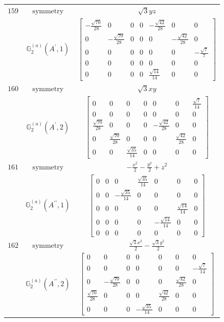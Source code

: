 \documentclass[fleqn,8pt,landscape]{jsarticle}
\begin{document}
\begin{longtable}{ccc}
$ 159 $ & $ \text{symmetry} $ & $ \sqrt{3} y z $ \\
$  $ & $ \mathbb{G}_{2}^{(a)}(A^{\prime},1) $ & $ \begin{bmatrix} - \frac{\sqrt{70}}{28} & 0 & 0 & 0 & - \frac{\sqrt{42}}{28} & 0 & 0 \\ 0 & - \frac{\sqrt{70}}{28} & 0 & 0 & 0 & - \frac{\sqrt{42}}{28} & 0 \\ 0 & 0 & 0 & 0 & 0 & 0 & - \frac{\sqrt{7}}{7} \\ 0 & 0 & 0 & 0 & 0 & 0 & 0 \\ 0 & 0 & 0 & 0 & \frac{\sqrt{14}}{14} & 0 & 0 \end{bmatrix} $ \\ \hline
$ 160 $ & $ \text{symmetry} $ & $ \sqrt{3} x y $ \\
$  $ & $ \mathbb{G}_{2}^{(a)}(A^{\prime},2) $ & $ \begin{bmatrix} 0 & 0 & 0 & 0 & 0 & 0 & \frac{\sqrt{7}}{14} \\ 0 & 0 & 0 & 0 & 0 & 0 & 0 \\ \frac{\sqrt{70}}{28} & 0 & 0 & 0 & - \frac{\sqrt{42}}{28} & 0 & 0 \\ 0 & \frac{\sqrt{70}}{28} & 0 & 0 & 0 & \frac{\sqrt{42}}{28} & 0 \\ 0 & 0 & \frac{\sqrt{35}}{14} & 0 & 0 & 0 & 0 \end{bmatrix} $ \\ \hline
$ 161 $ & $ \text{symmetry} $ & $ - \frac{x^{2}}{2} - \frac{y^{2}}{2} + z^{2} $ \\
$  $ & $ \mathbb{G}_{2}^{(a)}(A^{\prime\prime},1) $ & $ \begin{bmatrix} 0 & 0 & 0 & \frac{\sqrt{35}}{14} & 0 & 0 & 0 \\ 0 & 0 & - \frac{\sqrt{35}}{14} & 0 & 0 & 0 & 0 \\ 0 & 0 & 0 & 0 & 0 & \frac{\sqrt{14}}{14} & 0 \\ 0 & 0 & 0 & 0 & - \frac{\sqrt{14}}{14} & 0 & 0 \\ 0 & 0 & 0 & 0 & 0 & 0 & 0 \end{bmatrix} $ \\ \hline
$ 162 $ & $ \text{symmetry} $ & $ \frac{\sqrt{3} x^{2}}{2} - \frac{\sqrt{3} y^{2}}{2} $ \\
$  $ & $ \mathbb{G}_{2}^{(a)}(A^{\prime\prime},2) $ & $ \begin{bmatrix} 0 & 0 & 0 & 0 & 0 & 0 & 0 \\ 0 & 0 & 0 & 0 & 0 & 0 & - \frac{\sqrt{7}}{14} \\ 0 & - \frac{\sqrt{70}}{28} & 0 & 0 & 0 & \frac{\sqrt{42}}{28} & 0 \\ \frac{\sqrt{70}}{28} & 0 & 0 & 0 & \frac{\sqrt{42}}{28} & 0 & 0 \\ 0 & 0 & 0 & - \frac{\sqrt{35}}{14} & 0 & 0 & 0 \end{bmatrix} $ \\ \hline

\end{longtable}
\end{document}
